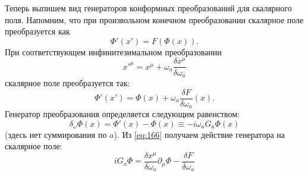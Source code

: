 \documentclass[a4paper,12pt]{article} \usepackage[utf8x]{inputenc} \usepackage[russian]{babel}
\theoremstyle{definition} \newtheorem{corollary}{Corollary}[theorem] \theoremstyle{definition}
\begin{document}
Теперь выпишем вид генераторов конформных преобразований для скалярного поля. Напомним, что при
произвольном конечном преобразовании скалярное поле преобразуется как
\begin{equation}
  \label{eq:164} \Phi'(x')=F(\Phi(x)).
\end{equation} При соответствующем инфинитезимальном преобразовании
\begin{equation}
  \label{eq:165} x'^{\mu}=x^{\mu}+\omega_a \frac{\delta x^{\mu}}{\delta \omega_a}
\end{equation} скалярное поле преобразуется так:
\begin{equation}
  \label{eq:166} \Phi'(x')=\Phi(x)+\omega_a \frac{\delta F}{\delta \omega_a} (x).
\end{equation} Генератор преобразования определяется следующим равенством:
\begin{equation}
  \label{eq:167} \delta_{\omega} \Phi(x)=\Phi'(x)-\Phi(x)\equiv -i\omega_a G_a \Phi(x)
\end{equation} (здесь нет суммирования по $a$). Из \eqref{eq:166} получаем действие генератора на
скалярное поле:
\begin{equation}
  \label{eq:168} iG_a \Phi=\frac{\delta x^{\mu}}{\delta\omega_a} \partial_{\mu}\Phi-\frac{\delta
F}{\delta \omega_a}
\end{equation}
\end{document}
